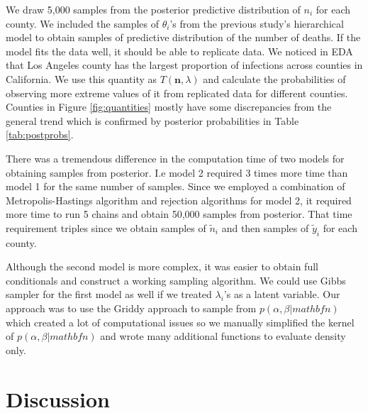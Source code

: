 \documentclass[11pt,twocolumn]{asaproc}
\begin{document}
We draw 5,000 samples from the posterior predictive distribution of $n_i$ for each county. We included the samples of $\theta_i$'s from the previous study's hierarchical model to obtain samples of predictive distribution of the number of deaths. If the model fits the data well, it should be able to replicate data. We noticed in EDA that Los Angeles county has the largest proportion of infections across counties in California. We use this quantity as $T(\mathbf{n}, \lambda)$ and calculate the probabilities of observing more extreme values of it from replicated data for different counties. Counties in Figure \ref{fig:quantities} mostly have some discrepancies from the general trend which is confirmed by posterior probabilities in Table \ref{tab:postprobs}. 

 

There was a tremendous difference in the computation time of two models for obtaining samples from posterior. I.e model 2 required 3 times more time than model 1 for the same number of samples. Since we employed a combination of Metropolis-Hastings algorithm and rejection algorithms for model 2, it required more time to run 5 chains and obtain 50,000 samples from posterior. That time requirement triples since we obtain samples of $\tilde{n}_i$ and then samples of $\tilde{y}_i$ for each county. 

Although the second model is more complex, it was easier to obtain full conditionals and construct a working sampling algorithm. We could use Gibbs sampler for the first model as well if we treated $\lambda_i$'s as a latent variable. Our approach was to use the Griddy approach to sample from $p(\alpha, \beta | mathbf{n})$ which created a lot of computational issues so we manually simplified the kernel of $p(\alpha, \beta | mathbf{n})$ and wrote many additional functions to evaluate density only. 


















\section{Discussion} %
\end{document}
